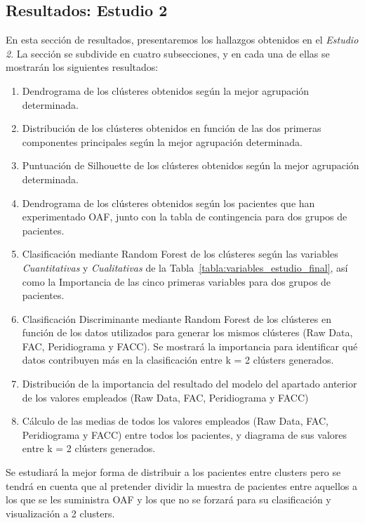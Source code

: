 \subsection{Resultados: Estudio 2}\label{sec:resultados-estudio-1}

En esta sección de resultados, presentaremos los hallazgos obtenidos en el \textit{Estudio 2}. La sección se subdivide en cuatro subsecciones, y en cada una de ellas se mostrarán los siguientes resultados:

\begin{enumerate}
    \item Dendrograma de los clústeres obtenidos según la mejor agrupación determinada.
    \item Distribución de los clústeres obtenidos en función de las dos primeras componentes principales según la mejor agrupación determinada.
    \item Puntuación de Silhouette de los clústeres obtenidos según la mejor agrupación determinada.
    \item Dendrograma de los clústeres obtenidos según los pacientes que han experimentado OAF, junto con la tabla de contingencia para dos grupos de pacientes.
    \item Clasificación mediante Random Forest de los clústeres según las variables \textit{Cuantitativas} y \textit{Cualitativas} de la Tabla~\ref{tabla:variables_estudio_final}, así como la Importancia de las cinco primeras variables para dos grupos de pacientes.
    \item Clasificación Discriminante mediante Random Forest de los clústeres en función de los datos utilizados para generar los mismos clústeres (Raw Data, FAC, Peridiograma y FACC). Se mostrará la importancia para identificar qué datos contribuyen más en la clasificación entre k = 2 clústers generados.
    \item Distribución de la importancia del resultado del modelo del apartado anterior de los valores empleados (Raw Data, FAC, Peridiograma y FACC) 
    \item Cálculo de las medias de todos los valores empleados (Raw Data, FAC, Peridiograma y FACC) entre todos los pacientes, y diagrama de sus valores entre k = 2 clústers generados.
\end{enumerate}

Se estudiará la mejor forma de distribuir a los pacientes entre clusters pero se tendrá en cuenta que al pretender dividir la muestra de pacientes entre aquellos a los que se les suministra  OAF y los que no se forzará para su clasificación y visualización a 2 clusters.

